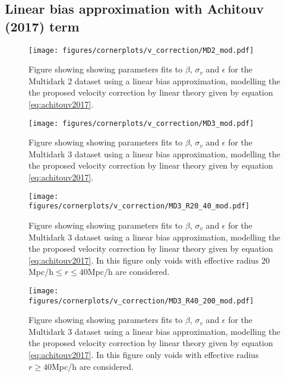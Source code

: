 \subsection{Linear bias approximation with Achitouv (2017) term}
\begin{figure}[htbp]\label{fig:linbiasMD2mod}
    \texttt{[image: figures/cornerplots/v\_correction/MD2\_mod.pdf]}
    \caption{Figure showing showing parameters fits to $\beta$, $\sigma_v$ and $\epsilon$ for the Multidark 2 dataset using a linear bias approximation, modelling the the proposed velocity correction by \cite{Achitouv_streaming} linear theory given by equation \ref{eq:achitouv2017}.}
\end{figure}

\begin{figure}[htbp]\label{fig:linbiasMD3mod}
    \texttt{[image: figures/cornerplots/v\_correction/MD3\_mod.pdf]}
    \caption{Figure showing showing parameters fits to $\beta$, $\sigma_v$ and $\epsilon$ for the Multidark 3 dataset using a linear bias approximation, modelling the the proposed velocity correction by \cite{Achitouv_streaming} linear theory given by equation \ref{eq:achitouv2017}.}
\end{figure}

\begin{figure}[htbp]\label{fig:linbiasMD3modR2040}
    \texttt{[image: figures/cornerplots/v\_correction/MD3\_R20\_40\_mod.pdf]}
    \caption{Figure showing showing parameters fits to $\beta$, $\sigma_v$ and $\epsilon$ for the Multidark 3 dataset using a linear bias approximation, modelling the the proposed velocity correction by \cite{Achitouv_streaming} linear theory given by equation \ref{eq:achitouv2017}. In this figure only voids with effective radius $20$Mpc/h$\leq r \leq 40$Mpc/h are considered.}
\end{figure}

\begin{figure}[htbp]\label{fig:linbiasMD3modR40}
    \texttt{[image: figures/cornerplots/v\_correction/MD3\_R40\_200\_mod.pdf]}
    \caption{Figure showing showing parameters fits to $\beta$, $\sigma_v$ and $\epsilon$ for the Multidark 3 dataset using a linear bias approximation, modelling the the proposed velocity correction by \cite{Achitouv_streaming} linear theory given by equation \ref{eq:achitouv2017}. In this figure only voids with effective radius $r \geq 40$Mpc/h are considered.}
\end{figure}


